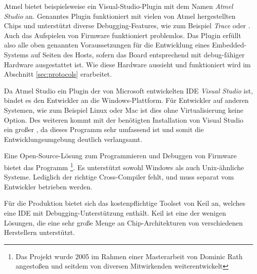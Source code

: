         Atmel bietet beispielsweise ein Visual-Studio-Plugin mit dem Namen \textit{Atmel Studio} an. Genanntes Plugin
        funktioniert mit vielen von Atmel hergestellten Chips und unterstützt diverse Debugging-Features, wie zum Beispiel
        \textit{Trace} oder . Auch das Aufspielen von Firmware funktioniert problemlos.
        Das Plugin erfüllt also alle oben genannten Voraussetzungen für die Entwicklung eines Embedded-Systems auf
        Seiten des Hosts, sofern das Board entsprechend mit debug-fähiger Hardware ausgestattet ist. Wie diese Hardware
        aussieht und funktioniert wird im Abschnitt \ref{sec:protocols} erarbeitet.

        Da Atmel Studio ein Plugin der von Microsoft entwickelten IDE \textit{Visual Studio} ist, bindet es den
        Entwickler an die Windows-Plattform. Für Entwickler auf anderen Systemen, wie zum Beispiel Linux oder Mac ist
        dies ohne Virtualisierung keine Option. Des weiteren kommt mit der benötigten Installation von Visual Studio ein
        großer , da dieses Programm sehr umfassend ist und somit die Entwicklungsumgebung deutlich verlangsamt.

        Eine Open-Source-Lösung zum Programmieren und Debuggen von Firmware bietet das Programm 
        \footnote{Das Projekt wurde 2005 im Rahmen einer Masterarbeit von Dominic Rath
        angestoßen und seitdem von diversen Mitwirkenden weiterentwickelt}.
        Es unterstützt sowohl Windows als auch Unix-ähnliche
        Systeme. Lediglich der richtige Cross-Compiler fehlt, und muss separat vom Entwickler betrieben werden.

        Für die Produktion bietet sich das kostenpflichtige Toolset von Keil an, welches eine IDE mit
        Debugging-Unterstützung enthält. Keil ist eine der wenigen Lösungen, die eine sehr große Menge an
        Chip-Architekturen von verschiedenen Herstellern unterstützt.

